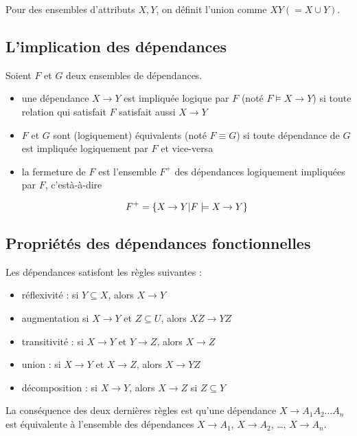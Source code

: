 		Pour des ensembles d'attributs $X, Y$, on définit l'union comme $XY (= X \cup Y)$.
		
		\subsection{L'implication des dépendances}
		
		Soient $F$ et $G$ deux ensembles de dépendances.
		
		\begin{itemize}
			\item une dépendance $X \rightarrow Y$ est impliquée logique par $F$ (noté $F \models X \rightarrow Y$) si toute relation qui satisfait $F$ satisfait aussi $X \rightarrow Y$
			
			\item $F$ et $G$ sont (logiquement) équivalents (noté $F \equiv G$) si toute dépendance de $G$ est impliquée logiquement par $F$ et vice-versa
			\item la fermeture de $F$ est l'ensemble $F^+$ des dépendances logiquement impliquées par $F$, c'està-à-dire
			
			$$F^+ = \lbrace X \rightarrow Y \vert F \models X \rightarrow Y \rbrace$$
		\end{itemize}
		
		
		\subsection{Propriétés des dépendances fonctionnelles}
		
		Les dépendances satisfont les règles suivantes :
		
		\begin{itemize}
			\item réflexivité : si $Y \subseteq X$, alors $X \rightarrow Y$
			\item augmentation si $X \rightarrow Y$ et $Z \subseteq U$, alors $XZ \rightarrow Y Z$
			\item transitivité : si $X \rightarrow Y$ et $Y \rightarrow Z$, alors $X \rightarrow Z$
			\item union : si $X \rightarrow Y$ et $X \rightarrow Z$, alors $X \rightarrow YZ$
			\item décomposition : si $X \rightarrow Y$, alors $X \rightarrow Z$ si $Z \subseteq Y$
		\end{itemize}
		
		La conséquence des deux dernières règles est qu'une dépendance $X \rightarrow A_1 A_2 \dots A_n$ est équivalente à l'ensemble des dépendances $X \rightarrow A_1$, $X \rightarrow A_2$, \dots , $X \rightarrow A_n$.
		
